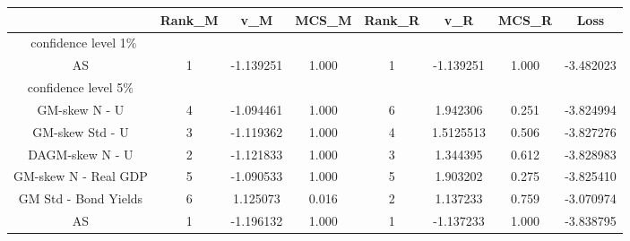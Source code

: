\documentclass{article}
\begin{document}


\begin{table}[ht] \small
\centering
\begin{tabular}{|cccccccc|}
\hline
 & Rank\_M  & v\_M & MCS\_M & Rank\_R & v\_R & MCS\_R & Loss \\
\hline
\
confidence level 1\%\\
AS & 1 & -1.139251 & 1.000 & 1 & -1.139251 & 1.000 & -3.482023\\
\hline
confidence level 5\% \\
GM-skew N - U & 4 & -1.094461 & 1.000 & 6 & 1.942306 & 0.251 & -3.824994 \\
GM-skew Std - U & 3 & -1.119362 & 1.000 & 4 & 1.5125513 & 0.506 & -3.827276 \\
DAGM-skew N - U & 2 & -1.121833 & 1.000 & 3 & 1.344395 & 0.612 & -3.828983\\
GM-skew N - Real GDP & 5 & -1.090533 & 1.000 & 5 & 1.903202 & 0.275 & -3.825410\\
GM Std - Bond Yields & 6 &  1.125073 & 0.016 & 2 & 1.137233 & 0.759 & -3.070974\\
AS & 1 & -1.196132 & 1.000 & 1 & -1.137233 & 1.000 & -3.838795\\
\end{tabular}
\end{table}
\end{document}
